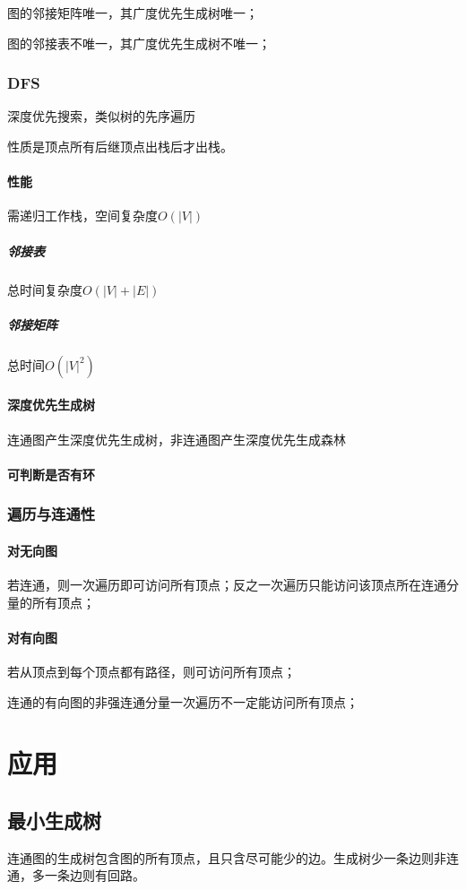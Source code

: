 图的邻接矩阵唯一，其广度优先生成树唯一；

图的邻接表不唯一，其广度优先生成树不唯一；


\subsubsection{DFS}
深度优先搜索，类似树的先序遍历

性质是顶点所有后继顶点出栈后才出栈。

\paragraph{性能}
需递归工作栈，空间复杂度\(O(|V|)\)

\subparagraph{邻接表}
总时间复杂度\(O(|V| + |E|)\)

\subparagraph{邻接矩阵}
总时间\(O(|V|^2)\)

\paragraph{深度优先生成树}
连通图产生深度优先生成树，非连通图产生深度优先生成森林

\paragraph{可判断是否有环}


\subsubsection{遍历与连通性}

\paragraph{对无向图}
若连通，则一次遍历即可访问所有顶点；反之一次遍历只能访问该顶点所在连通分量的所有顶点；

\paragraph{对有向图}
若从顶点到每个顶点都有路径，则可访问所有顶点；

连通的有向图的非强连通分量一次遍历不一定能访问所有顶点；

\section{应用}
\subsection{最小生成树}
连通图的生成树包含图的所有顶点，且只含尽可能少的边。生成树少一条边则非连通，多一条边则有回路。

